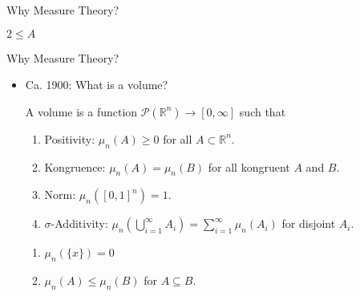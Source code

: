 \documentclass{beamer}
\newcommand{\RR}{\mathbb{R}}
\begin{document}
\begin{frame}{Why Measure Theory?}
  \begin{minipage}{0.45\linewidth}
  \begin{center}
  \end{center}
  \end{minipage}%
  \begin{minipage}{0.45\linewidth}
    $2 \leq A$
 

  \end{minipage}
\end{frame}


\begin{frame}{Why Measure Theory?}

  \begin{itemize}
  \item Ca. 1900: What is a volume?
    \begin{definition}
      A volume is a function $\mathcal{P}(\RR^n) \to [0, \infty]$ such that
      \begin{enumerate}
      \item Positivity: $\mu_n(A) \geq 0$ for all $A \subset \RR^n$.
      \item Kongruence: $\mu_n(A) = \mu_n(B)$ for all kongruent $A$ and $B$.
      \item Norm: $\mu_n([0,1]^n) = 1$.
      \item $\sigma$-Additivity: $\mu_n(\bigcup_{i=1}^{\infty} A_i) =
        \sum_{i=1}^\infty \mu_n(A_i)$ for disjoint $A_i$.
      \end{enumerate}
    \end{definition}
    \begin{lemma}
      \begin{enumerate}
      \item $\mu_n(\{x\}) = 0$
      \item $\mu_n(A) \leq \mu_n(B)$ for $A \subseteq B$.
      \end{enumerate}
    \end{lemma}

  \end{itemize}



\end{frame}
\end{document}
